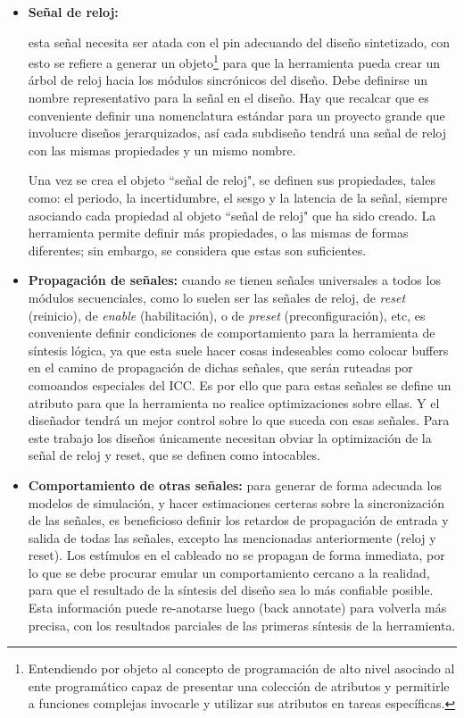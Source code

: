 \begin{itemize}
\item \textbf{Señal de reloj:} {esta señal necesita ser atada con el pin adecuando del diseño sintetizado, con esto se refiere a generar un objeto\footnote{Entendiendo por objeto al concepto de programación de alto nivel asociado al ente programático capaz de presentar una colección de atributos y permitirle a funciones complejas invocarle y utilizar sus atributos en tareas específicas.} para que la herramienta pueda crear un árbol de reloj hacia los módulos sincrónicos del diseño. Debe definirse un nombre representativo para la señal en el diseño. Hay que recalcar que es conveniente definir una nomenclatura estándar para un proyecto grande que involucre diseños jerarquizados, así cada subdiseño tendrá una señal de reloj con las mismas propiedades y un mismo nombre.

Una vez se crea el objeto ``señal de reloj", se definen sus propiedades, tales como: el periodo, la incertidumbre, el sesgo y la latencia de la señal, siempre asociando cada propiedad al objeto ``señal de reloj" que ha sido creado. La herramienta permite definir más propiedades, o las mismas de formas diferentes; sin embargo, se considera que estas son suficientes.}

\item \textbf{Propagación de señales:} {cuando se tienen señales universales a todos los módulos secuenciales, como lo suelen ser las señales de reloj, de \textit{reset} (reinicio), de \textit{enable} (habilitación), o de \textit{preset} (preconfiguración), etc, es conveniente definir condiciones de comportamiento para la herramienta de síntesis lógica, ya que esta suele hacer cosas indeseables como colocar buffers en el camino de propagación de dichas señales, que serán ruteadas por comoandos especiales del ICC. Es por ello que para estas señales se define un atributo para que la herramienta no realice optimizaciones sobre ellas. Y el diseñador tendrá un mejor control sobre lo que suceda con esas señales. Para este trabajo los diseños únicamente necesitan obviar la optimización de la señal de reloj y reset, que se definen como intocables.}

\item \textbf{Comportamiento de otras señales:} {para generar de forma adecuada los modelos de simulación, y hacer estimaciones certeras sobre la sincronización de las señales, es beneficioso definir los retardos de propagación de entrada y salida de todas las señales, excepto las mencionadas anteriormente (reloj y reset). Los estímulos en el cableado no se propagan de forma inmediata, por lo que se debe procurar emular un comportamiento cercano a la realidad, para que el resultado de la síntesis del diseño sea lo más confiable posible. Esta información puede re-anotarse luego (back annotate) para volverla más precisa, con los resultados parciales de las primeras síntesis de la herramienta.}


\end{itemize}

